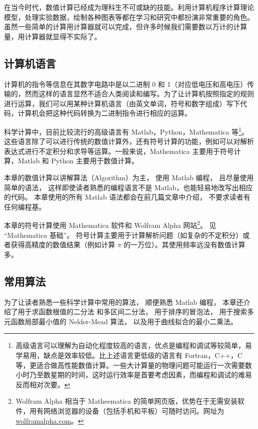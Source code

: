 
在当今时代，数值计算已经成为理科生不可或缺的技能。利用计算机程序计算理论模型，处理实验数据，绘制各种图表等都在学习和研究中都扮演非常重要的角色。虽然一些简单的计算用计算器就可以完成，但许多时候我们需要数以万计的计算量，用计算器就显得不实际了。

\subsection{计算机语言}
计算机的指令等信息在其数字电路中是以二进制 0 和 1（对应低电压和高电压）传输的，然而这样的语言显然不适合人类阅读和编写。为了让计算机按照指定的规则进行运算，我们可以用某种计算机语言（由英文单词，符号和数字组成）写下代码，计算机会把这种代码转换为二进制指令进行相应的运算。

科学计算中，目前比较流行的高级语言有 Matlab，Python，Mathematica 等\footnote{高级语言可以理解为自动化程度较高的语言，优点是编程和调试等较简单，易学易用，缺点是效率较低。比上述语言更低级的语言有 Fortran，C++，C 等，更适合做高性能数值计算。一些大计算量的物理问题可能运行一次需要数小时乃至数星期的时间，这时运行效率是首要考虑因素，而编程和调试的难易反而相对次要。}。这些语言除了可以进行传统的数值计算外，还有符号计算的功能，例如可以对解析表达式进行不定积分和求导等运算。一般来说，Mathematica 主要用于符号计算，Matlab 和 Python 主要用于数值计算。

本章的数值计算以讲解算法（Algorithm）为主， 使用 Matlab 编程， 且尽量使用简单的语法， 这样即使读者熟悉的编程语言不是 Matlab，也能轻易地改写出相应的代码。 本章使用的所有 Matlab 语法都会在前几篇文章中介绍， 不要求读者有任何编程基。

本章的符号计算使用 Mathematica 软件和 Wolfram Alpha 网站\footnote{Wolfram Alpha 相当于 Matheematica 的简单网页版，优势在于无需安装软件，用有网络浏览器的设备（包括手机和平板）可随时访问。网址为 \href{https://www.wolframalpha.com/}{wolframalpha.com}。}。 见 “Mathematica 基础”。%
符号计算主要用于计算解析问题（如复杂的不定积分）或者获得高精度的数值结果（例如计算 $\pi$ 的一万位）。其使用频率远没有数值计算多。

\subsection{常用算法}
为了让读者熟悉一些科学计算中常用的算法， 顺便熟悉 Matlab 编程， 本章还介绍了用于求函数根值的二分法 和多区间二分法， 用于排序的冒泡法， 用于搜索多元函数局部最小值的 Nelder-Mead 算法， 以及用于曲线拟合的最小二乘法。%

